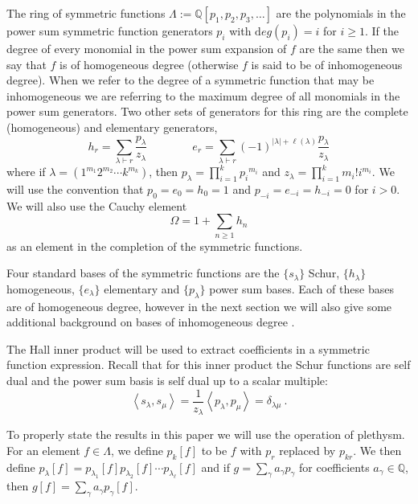 \documentclass{amsart}
\theoremstyle{definition}
\begin{document}
The ring of symmetric functions $\Lambda := \mathbb{Q}[p_1, p_2, p_3, \ldots]$
are the polynomials in the power sum symmetric
function generators $p_i$ with ${\mathrm deg}(p_i) = i$ for $i\geq1$.
If the degree of every monomial in the power sum expansion of
$f$ are the same then we say that $f$ is of homogeneous degree (otherwise $f$ is
said to be of inhomogeneous degree).
When we refer to the degree of a symmetric function that may be inhomogeneous
we are referring to the maximum degree of all monomials in the power sum generators.
Two other sets of generators for this ring are the complete (homogeneous) and
elementary generators,
\[
h_r = \sum_{\lambda \vdash r} \frac{p_\lambda}{z_\lambda}
\qquad\qquad
e_r = \sum_{\lambda \vdash r} (-1)^{|\lambda|+\ell(\lambda)} \frac{p_\lambda}{z_\lambda}
\]
where if $\lambda = (1^{m_1}2^{m_2}\cdots k^{m_k})$, then
$p_\lambda=\prod_{i=1}^k{p_i}^{m_i}$ and $z_\lambda = \prod_{i=1}^k m_i! i^{m_i}$.  We will use the convention that
$p_0 =e_0 = h_0= 1$ and $p_{-i} = e_{-i} = h_{-i} = 0$ for $i>0$.
We will also use the Cauchy element
\[
\Omega = 1 + \sum_{n \geq 1} h_n
\]
as an element in the completion of the symmetric functions.

Four standard bases of the symmetric functions
are the $\{ s_\lambda \}$ Schur, $\{ h_\lambda \}$ homogeneous, $\{ e_\lambda \}$ elementary
and $\{ p_\lambda \}$ power sum bases.  Each of these bases are of homogeneous degree,
however in the next section we will also give some additional
background on bases of inhomogeneous degree \cite{OZ_hopf, OZ_character}.


The Hall inner product will be used to extract coefficients in a symmetric function expression. Recall that for this inner product the Schur functions are self dual and the power sum basis is self dual up to a scalar multiple:
\[
\left< s_\lambda, s_\mu \right> = \frac{1}{z_\lambda} \left< p_\lambda, p_\mu \right> = \delta_{\lambda\mu}~.
\]


To properly state the results in this paper we will use the operation
of plethysm.  For an element $f \in \Lambda$, we define $p_k[f]$ to be $f$ with $p_r$ replaced by $p_{kr}$.
We then define $p_\lambda[f] = p_{\lambda_1}[f] p_{\lambda_2}[f] \cdots p_{\lambda_\ell}[f]$
and if $g = \sum_{\gamma} a_\gamma p_\gamma$ for coefficients $a_\gamma \in \mathbb{Q}$,
then $g[f] = \sum_{\gamma} a_\gamma p_\gamma[f]$.
\end{document}
